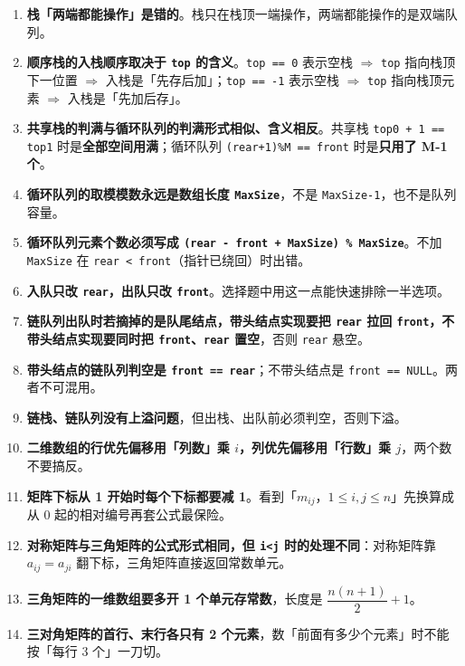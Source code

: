 \documentclass[11pt,openany,UTF8]{ctexbook}
\begin{document}
\begin{enumerate}
\item \textbf{栈「两端都能操作」是错的}。栈只在栈顶一端操作，两端都能操作的是双端队列。
\item \textbf{顺序栈的入栈顺序取决于 \texttt{top} 的含义}。\texttt{top =\allowbreak{}=\allowbreak{} 0} 表示空栈 $\Rightarrow$ \texttt{top} 指向栈顶下一位置 $\Rightarrow$ 入栈是「先存后加」；\texttt{top =\allowbreak{}=\allowbreak{} -1} 表示空栈 $\Rightarrow$ \texttt{top} 指向栈顶元素 $\Rightarrow$ 入栈是「先加后存」。
\item \textbf{共享栈的判满与循环队列的判满形式相似、含义相反}。共享栈 \texttt{top0 +\allowbreak{} 1 =\allowbreak{}=\allowbreak{} top1} 时是\textbf{全部空间用满}；循环队列 \texttt{(rear+\allowbreak{}1)\allowbreak{}\%M =\allowbreak{}=\allowbreak{} front} 时是\textbf{只用了 M-1 个}。
\item \textbf{循环队列的取模模数永远是数组长度 \texttt{MaxSize}}，不是 \texttt{MaxSize-1}，也不是队列容量。
\item \textbf{循环队列元素个数必须写成 \texttt{(rear - front +\allowbreak{} MaxSize)\allowbreak{} \% MaxSize}}。不加 \texttt{MaxSize} 在 \texttt{rear <\allowbreak{} front}（指针已绕回）时出错。
\item \textbf{入队只改 \texttt{rear}，出队只改 \texttt{front}}。选择题中用这一点能快速排除一半选项。
\item \textbf{链队列出队时若摘掉的是队尾结点，带头结点实现要把 \texttt{rear} 拉回 \texttt{front}，不带头结点实现要同时把 \texttt{front}、\texttt{rear} 置空}，否则 \texttt{rear} 悬空。
\item \textbf{带头结点的链队列判空是 \texttt{front =\allowbreak{}=\allowbreak{} rear}}；不带头结点是 \texttt{front =\allowbreak{}=\allowbreak{} NULL}。两者不可混用。
\item \textbf{链栈、链队列没有上溢问题}，但出栈、出队前必须判空，否则下溢。
\item \textbf{二维数组的行优先偏移用「列数」乘 $i$，列优先偏移用「行数」乘 $j$}，两个数不要搞反。
\item \textbf{矩阵下标从 1 开始时每个下标都要减 1}。看到「$m_{ij}$，$1 \le i,j \le n$」先换算成从 0 起的相对编号再套公式最保险。
\item \textbf{对称矩阵与三角矩阵的公式形式相同，但 \texttt{i<\allowbreak{}j} 时的处理不同}：对称矩阵靠 $a_{ij}=a_{ji}$ 翻下标，三角矩阵直接返回常数单元。
\item \textbf{三角矩阵的一维数组要多开 1 个单元存常数}，长度是 $\dfrac{n(n+1)}{2}+1$。
\item \textbf{三对角矩阵的首行、末行各只有 2 个元素}，数「前面有多少个元素」时不能按「每行 3 个」一刀切。

\end{enumerate}
\end{document}
